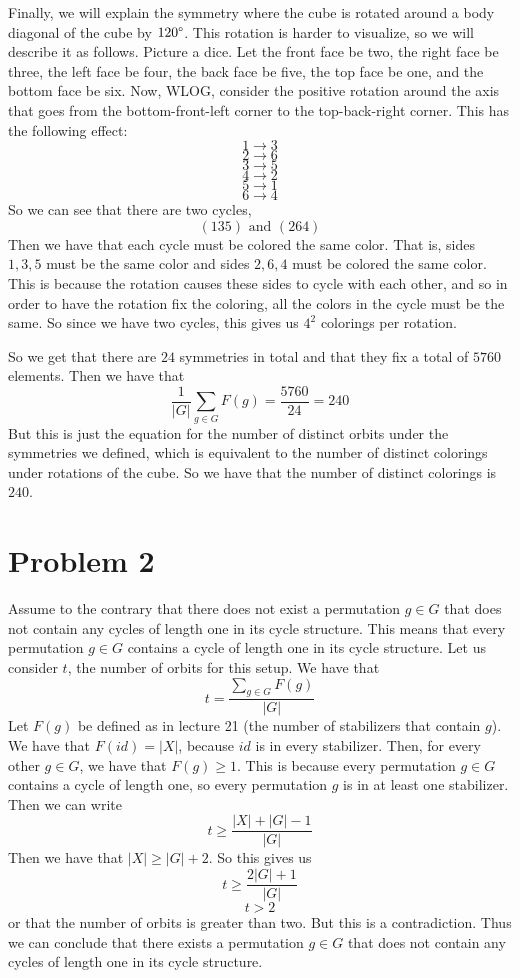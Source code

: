 \documentclass{article}
\begin{document}
Finally, we will explain the symmetry where the cube is rotated around a body
diagonal of the cube by $120 \degree$. This rotation is harder to visualize,
so we will describe it as follows. Picture a dice. Let the front face
be two, the right face be three, the left face be four, the back face be five,
the top face be one, and the bottom face be six. Now, WLOG, consider the
positive rotation around the axis that goes from the bottom-front-left corner
to the top-back-right corner. This has the following effect:
\[ 1 \rightarrow 3 \]
\[ 2 \rightarrow 6 \]
\[ 3 \rightarrow 5 \]
\[ 4 \rightarrow 2 \]
\[ 5 \rightarrow 1 \]
\[ 6 \rightarrow 4 \]
So we can see that there are two cycles,
\[ (135) \text{ and } (264) \]
Then we have that each cycle must be colored the same color. That is,
sides $1,3,5$ must be the same color and sides $2,6,4$ must be colored the
same color. This is because the rotation causes these sides to cycle with
each other, and so in order to have the rotation fix the coloring, all
the colors in the cycle must be the same. So since we have two cycles,
this gives us $4^2$ colorings per rotation.

So we get that there are $24$ symmetries in total and that they fix a total of
$5760$ elements. Then we have that
\[ \frac{1}{|G|} \sum_{g \in G} F(g) = \frac{5760}{24} = 240 \]
But this is just the equation for the number of distinct orbits under the
symmetries we defined, which is equivalent to the number of distinct colorings
under rotations of the cube. So we have that the number of distinct colorings
is $240$.

\section*{Problem 2}
Assume to the contrary that there does not exist a permutation $g \in G$ that
does not contain any cycles of length one in its cycle structure. This means
that every permutation $g \in G$ contains a cycle of length one in its cycle
structure. Let us consider $t$, the number of orbits for this setup. We have
that
\[ t = \frac{ \sum_{g \in G} F(g) }{|G|} \]
Let $F(g)$ be defined as in lecture 21 (the number of stabilizers that contain
$g$). We have that $F(id) = |X|$, because $id$ is in every stabilizer. Then,
for every other $g \in G$, we have that $F(g) \geq 1$. This is because
every permutation $g \in G$ contains a cycle of length one, so every permutation
$g$ is in at least one stabilizer. Then we can write
\[ t \geq \frac{ |X| + |G| - 1 }{|G|} \]
Then we have that $|X| \geq |G| + 2$. So this gives us
\[ t \geq \frac{ 2|G| + 1 }{|G|} \]
\[ t > 2 \]
or that the number of orbits is greater than two. But this is a contradiction.
Thus we can conclude that there exists a permutation $g \in G$ that does not
contain any cycles of length one in its cycle structure.
\end{document}
